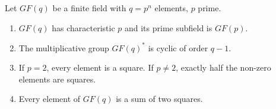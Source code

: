 Let $GF(q)$ be a finite field with $q = p^n$ elements, $p$ prime.
\begin{enumerate}
\item[(i)] $GF(q)$ has characteristic $p$ and its prime subfield is $GF(p)$.
\item[(ii)] The multiplicative group $GF(q)^*$ is cyclic of order $q-1$.
\item[(iii)] If $p=2$, every element is a square. If $p \neq 2$, exactly half the non-zero elements are squares.
\item[(iv)] Every element of $GF(q)$ is a sum of two squares.
\end{enumerate}
